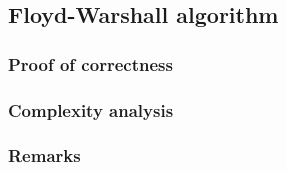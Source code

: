 \subsection{Floyd-Warshall algorithm} \label{algorithm-shortestpath-floydwarshall}

\subsubsection{Proof of correctness}

\subsubsection{Complexity analysis}

\subsubsection{Remarks}
